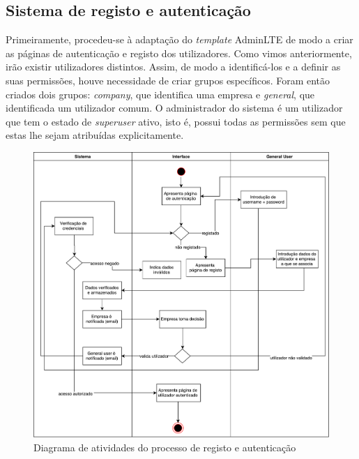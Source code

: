 \subsection{Sistema de registo e autenticação}

Primeiramente, procedeu-se à adaptação do \textit{template} AdminLTE de modo a criar as páginas de autenticação e registo dos utilizadores. Como vimos anteriormente, irão existir utilizadores distintos. Assim, de modo a identificá-los e a definir as suas permissões, houve necessidade de criar grupos específicos. Foram então criados dois grupos:  \textit{company}, que identifica uma empresa e \textit{general}, que identificada um utilizador comum. O administrador do sistema é um utilizador que tem o estado de \textit{superuser} ativo, isto é, possui todas as permissões sem que estas lhe sejam atribuídas explicitamente.


\begin{figure}[!htb]
	\centering
	\includegraphics[width=\linewidth]{esquemas/activitydiagram-autenticacao.pdf}
	\caption{Diagrama de atividades do processo de registo e autenticação}
	\label{activt-autent}
\end{figure}


